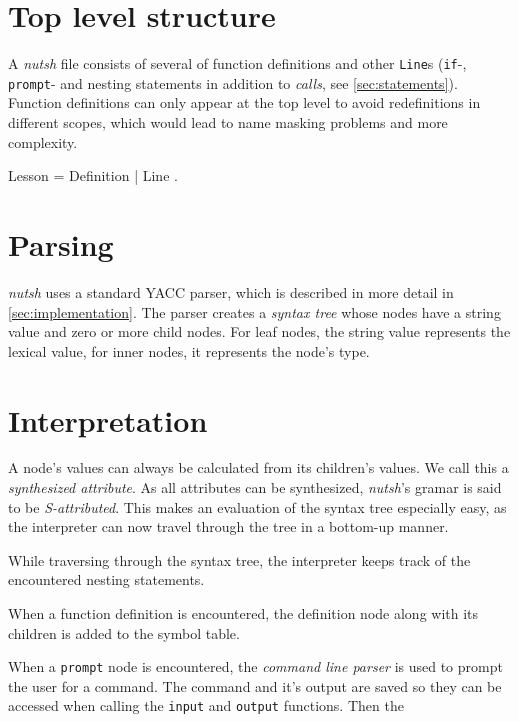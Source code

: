\documentclass[paper=a4,twoside,abstract=on,cleardoublepage=empty,numbers=noenddot,toc=bib,11pt,appendixprefix=true]{scrreprt}
\begin{document}
\section{Top level structure}

A \emph{nutsh} file consists of several of function definitions and other \texttt{Line}s (\texttt{if}-, \texttt{prompt}- and nesting statements in addition to \emph{calls}, see \cref{sec:statements}). Function definitions can only appear at the top level to avoid redefinitions in different scopes, which would lead to name masking problems and more complexity.

\begin{ebnf}
Lesson = { Definition | Line } .
\end{ebnf}

\section{Parsing}

\emph{nutsh} uses a standard YACC parser, which is described in more detail in \cref{sec:implementation}. The parser creates a \emph{syntax tree} whose nodes have a string value and zero or more child nodes. For leaf nodes, the string value represents the lexical value, for inner nodes, it represents the node's type.

\section{Interpretation}

A node's values can always be calculated from its children's values. We call this a \emph{synthesized attribute}. As all attributes can be synthesized, \emph{nutsh}'s gramar is said to be \emph{S-attributed}. This makes an evaluation of the syntax tree especially easy, as the interpreter can now travel through the tree in a bottom-up manner.

While traversing through the syntax tree, the interpreter keeps track of the encountered nesting statements.

When a function definition is encountered, the definition node along with its children is added to the symbol table.

When a \texttt{prompt} node is encountered, the \emph{command line parser} is used to prompt the user for a command. The command and it's output are saved so they can be accessed when calling the \texttt{input} and \texttt{output} functions. Then the 
\end{document}
